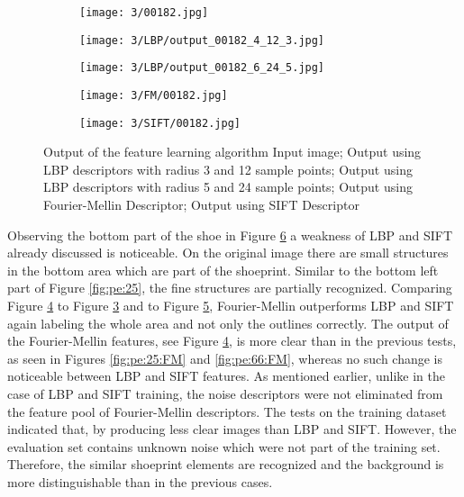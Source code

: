 \documentclass[draft,final]{vutinfth} %
\begin{document}
\begin{figure}[h]
  \centering
  \begin{subfigure}[t]{0.19\columnwidth}
    \centering
    \texttt{[image: 3/00182.jpg]}
    \subcaption{}
    \label{fig:pe:182:orig}
  \end{subfigure}
  \begin{subfigure}[t]{0.19\columnwidth}
    \centering
    \texttt{[image: 3/LBP/output\_00182\_4\_12\_3.jpg]}
    \subcaption{}
    \label{fig:pe:182:LBPs}
  \end{subfigure}
  \begin{subfigure}[t]{0.19\columnwidth}
    \centering
    \texttt{[image: 3/LBP/output\_00182\_6\_24\_5.jpg]}
    \subcaption{}
    \label{fig:pe:182:LBPb}
  \end{subfigure}
  \begin{subfigure}[t]{0.19\columnwidth}
    \centering
    \texttt{[image: 3/FM/00182.jpg]}
    \subcaption{}
    \label{fig:pe:182:FM}
  \end{subfigure}
  \begin{subfigure}[t]{0.19\columnwidth}
    \centering
    \texttt{[image: 3/SIFT/00182.jpg]}
    \subcaption{}
    \label{fig:pe:182:SIFT}
  \end{subfigure}
  \caption{Output of the feature learning algorithm  Input image;  Output using LBP descriptors with radius 3 and 12 sample points;  Output using LBP descriptors with radius 5 and 24 sample points;  Output using Fourier-Mellin Descriptor;  Output using SIFT Descriptor}
  \label{fig:pe:182}
\end{figure}

\par
Observing the bottom part of the shoe in Figure \ref{fig:pe:182} a weakness of LBP and SIFT already discussed is noticeable.
On the original image there are small structures in the bottom area which are part of the shoeprint.
Similar to the bottom left part of Figure \ref{fig:pe:25}, the fine structures are partially recognized.
Comparing Figure \ref{fig:pe:182:FM} to Figure \ref{fig:pe:182:LBPb} and to Figure \ref{fig:pe:182:SIFT}, Fourier-Mellin outperforms LBP and SIFT again labeling the whole area and not only the outlines correctly.
The output of the Fourier-Mellin features, see Figure \ref{fig:pe:182:FM}, is more clear than in the previous tests, as seen in Figures \ref{fig:pe:25:FM} and \ref{fig:pe:66:FM}, whereas no such change is noticeable between LBP and SIFT features.
As mentioned earlier, unlike in the case of LBP and SIFT training, the noise descriptors were not eliminated from the feature pool of Fourier-Mellin descriptors.
The tests on the training dataset indicated that, by producing less clear images than LBP and SIFT.
However, the evaluation set contains unknown noise which were not part of the training set.
Therefore, the similar shoeprint elements are recognized and the background is more distinguishable than in the previous cases.
\end{document}
